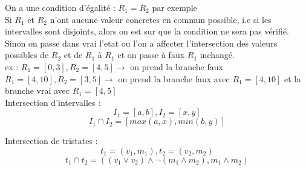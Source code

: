 \documentclass[a4paper,french, 12pt]{article}
\begin{document}
\begin{enumerate}
\begin{enumerate}
\begin{center}
		\end{center}
		On a une condition d'égalité : $R_1 = R_2$ par exemple\\
		Si $R_1$ et $R_2$ n'ont aucune valeur concretes en commun possible, i.e si les intervalles sont disjoints, alors on est sur que la condition ne sera pas vérifié.
		Sinon on passe dans vrai l'etat ou l'on a affecter l'intersection des valeurs possibles de $R_2$ et de $R_1$ à $R_1$ et on passe à faux $R_1$ inchangé.\\
		ex : $R_1 = [0,3], R_2 = [4,5] \to $ on prend la branche faux\\
		$R_1 = [4,10], R_2 = [3,5] \to $ on prend la branche faux avec $R_1 = [4,10]$ et la branche vrai avec $R_1 = [4,5]$\\

		Intersection d'intervalles :
		$$ I_1 = [a,b], I_2 = [x,y]$$
		$$ I_1 \cap I_2 = [max(a,x),min(b,y)]$$

		Intersection de tristates :
		$$ t_1 = (v_1,m_1), t_2 = (v_2, m_2) $$
		$$ t_1 \cap t_2 = ((v_1 \lor v_2)\land \neg (m_1\land m_2),m_1\land m_2)$$


\end{enumerate}
\end{enumerate}
\end{document}
